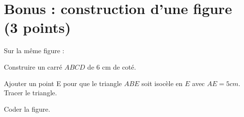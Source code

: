 \section{Bonus : construction d'une figure (3 points)}
Sur la même figure :
\begin{questions}
	
	
	\question[1] Construire un carré $ABCD$ de 6 cm de coté.
	
	\question[1] Ajouter un point E pour que le triangle $ABE$ soit isocèle en $E$ avec $AE = 5 cm$. Tracer le triangle.
	
	\question[1] Coder la figure.
\end{questions}
